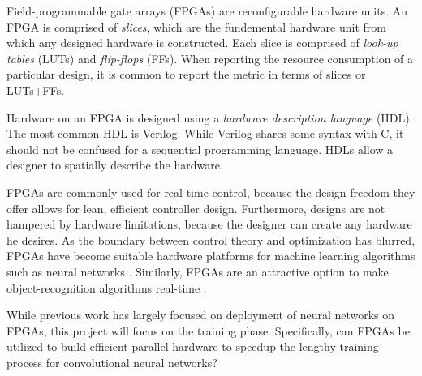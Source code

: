 Field-programmable gate arrays (FPGAs) are reconfigurable hardware units. An FPGA is comprised of \textit{slices}, which are the fundemental hardware unit from which any designed hardware is constructed. Each slice is comprised of \textit{look-up tables} (LUTs) and \textit{flip-flops} (FFs). When reporting the resource consumption of a particular design, it is common to report the metric in terms of slices or LUTs+FFs.

Hardware on an FPGA is designed using a \textit{hardware description language} (HDL). The most common HDL is Verilog. While Verilog shares some syntax with C, it should not be confused for a sequential programming language. HDLs allow a designer to spatially describe the hardware.

FPGAs are commonly used for real-time control, because the design freedom they offer allows for lean, efficient controller design. Furthermore, designs are not hampered by hardware limitations, because the designer can create any hardware he desires. As the boundary between control theory and optimization has blurred, FPGAs have become suitable hardware platforms for machine learning algorithms such as neural networks \cite{wang2008} \cite{skodzik2013}. Similarly, FPGAs are an attractive option to make object-recognition algorithms real-time \cite{ahn2015}.

While previous work has largely focused on deployment of neural networks on FPGAs, this project will focus on the training phase. Specifically, can FPGAs be utilized to build efficient parallel hardware to speedup the lengthy training process for convolutional neural networks?